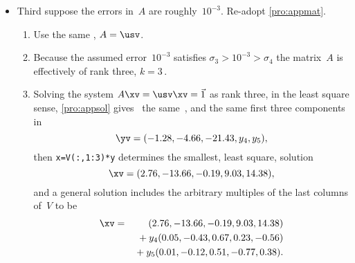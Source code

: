 \begin{example}
\begin{solution}
\begin{itemize}
\item Third suppose the errors in~\(A\) are roughly~\(10^{-3}\).
Re-adopt \cref{pro:appmat}.
\begin{enumerate}
\item Use the same \svd, \(A=\usv\).
\item Because the assumed error~\(10^{-3}\) satisfies \(\sigma_3>10^{-3}>\sigma_4\) the matrix~\(A\) is effectively of rank three, \(k=3\)\,.
\item Solving the system \(A\xv=\usv\xv=\vec1\) as rank three, in the least square sense, \cref{pro:appsol} gives \twodp\ the same~\zv, and the same first three components in
\begin{equation*}
\yv=(-1.28,-4.66,-21.43,y_4,y_5),
\end{equation*}
then \verb|x=V(:,1:3)*y| determines the smallest, least square, solution
\begin{equation*}
\xv=(2.76,-13.66,-0.19,9.03,14.38),
\end{equation*}
and a general solution includes the arbitrary multiples of the last columns of~\(V\) to be
\begin{eqnarray*}
\xv&=&(2.76,-13.66,-0.19,9.03,14.38)
\\&&{}+y_4(0.05,-0.43,0.67,0.23,-0.56)
\\&&{}+y_5(0.01,-0.12,0.51,-0.77,0.38).
\end{eqnarray*}
\end{enumerate}


\end{itemize}
\end{solution}
\end{example}
